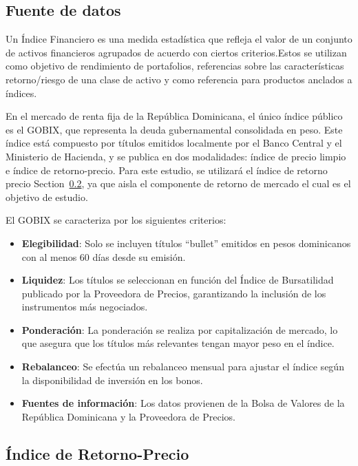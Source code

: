 \documentclass[
  number,
  preprint,
  3p,
  onecolumn]{elsarticle}
\providecommand{\tightlist}{%
  \setlength{\itemsep}{0pt}\setlength{\parskip}{0pt}}\usepackage{longtable,booktabs,array}
\begin{document}
\subsection{Fuente de datos}\label{fuente-de-datos}

Un Índice Financiero es una medida estadística que refleja el valor de
un conjunto de activos financieros agrupados de acuerdo con ciertos
criterios.Estos se utilizan como objetivo de rendimiento de portafolios,
referencias sobre las características retorno/riesgo de una clase de
activo y como referencia para productos anclados a índices.

En el mercado de renta fija de la República Dominicana, el único índice
público es el GOBIX, que representa la deuda gubernamental consolidada
en peso. Este índice está compuesto por títulos emitidos localmente por
el Banco Central y el Ministerio de Hacienda, y se publica en dos
modalidades: índice de precio limpio e índice de retorno-precio. Para
este estudio, se utilizará el índice de retorno precio
Section~\ref{sec-retorno-precio}, ya que aisla el componente de retorno
de mercado el cual es el objetivo de estudio.

El GOBIX se caracteriza por los siguientes criterios:

\begin{itemize}
\tightlist
\item
  \textbf{Elegibilidad}: Solo se incluyen títulos ``bullet'' emitidos en
  pesos dominicanos con al menos 60 días desde su emisión.
\item
  \textbf{Liquidez}: Los títulos se seleccionan en función del Índice de
  Bursatilidad publicado por la Proveedora de Precios, garantizando la
  inclusión de los instrumentos más negociados.
\item
  \textbf{Ponderación}: La ponderación se realiza por capitalización de
  mercado, lo que asegura que los títulos más relevantes tengan mayor
  peso en el índice.
\item
  \textbf{Rebalanceo}: Se efectúa un rebalanceo mensual para ajustar el
  índice según la disponibilidad de inversión en los bonos.
\item
  \textbf{Fuentes de información}: Los datos provienen de la Bolsa de
  Valores de la República Dominicana y la Proveedora de Precios.
\end{itemize}

\subsection{Índice de Retorno-Precio}\label{sec-retorno-precio}
\end{document}

